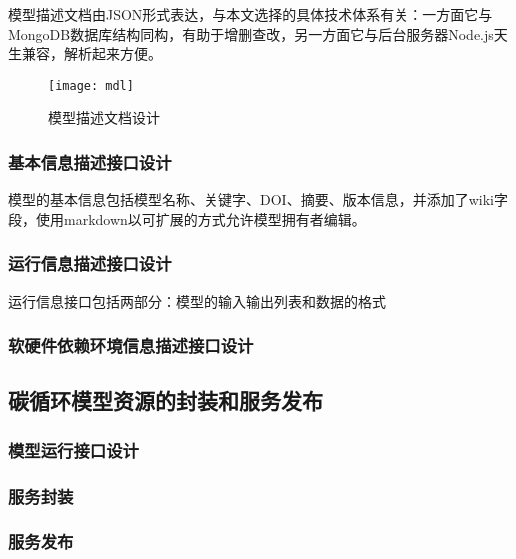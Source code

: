 模型描述文档由JSON形式表达，与本文选择的具体技术体系有关：一方面它与MongoDB数据库结构同构，有助于增删查改，另一方面它与后台服务器Node.js天生兼容，解析起来方便。

\begin{figure}[!htbp]
    \centering
    \texttt{[image: mdl]}
    \caption{模型描述文档设计}
    \label{fig:mdl}
\end{figure}

\subsubsection{基本信息描述接口设计}
模型的基本信息包括模型名称、关键字、DOI、摘要、版本信息，并添加了wiki字段，使用markdown以可扩展的方式允许模型拥有者编辑。

\subsubsection{运行信息描述接口设计}
运行信息接口包括两部分：模型的输入输出列表和数据的格式

\subsubsection{软硬件依赖环境信息描述接口设计}
% 

\subsection{碳循环模型资源的封装和服务发布}
\subsubsection{模型运行接口设计}
\subsubsection{服务封装}
\subsubsection{服务发布}


